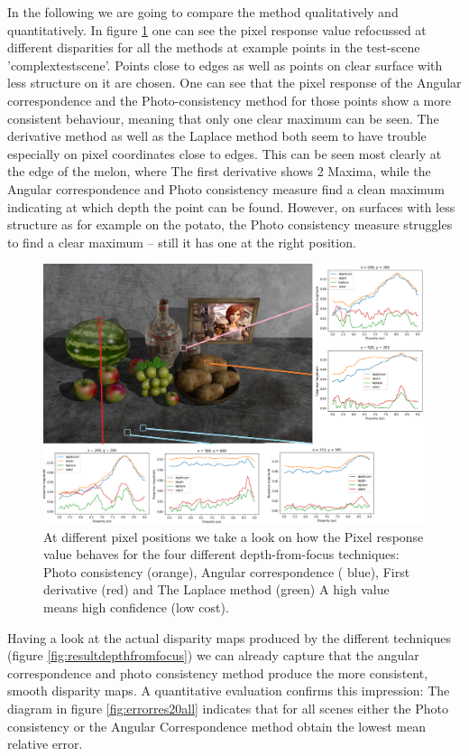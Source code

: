 \documentclass  [
  paper    = a4,
  BCOR     = 10mm,
  twoside,
  fontsize = 12pt,
  fleqn,
  toc      = bibnumbered,
  toc      = listofnumbered,
  numbers  = noendperiod,
  headings = normal,
  listof   = leveldown,
  version  = 3.03
]                                       {scrreprt}
\begin{document}
	In the following we are going to compare the method qualitatively and quantitatively. In figure \ref{fig:originalmarked} one can see the pixel response value refocussed at different disparities for all the methods at example points in the test-scene 'complextestscene'. Points close to edges as well as points on clear surface with less structure on it are chosen. One can see that the pixel response of the Angular correspondence and the Photo-consistency method for those points show a more consistent behaviour, meaning that only one clear maximum can be seen. The derivative method as well as the Laplace method both seem to have trouble especially on pixel coordinates close to edges. This can be seen most clearly at the edge of the melon, where The first derivative shows 2 Maxima, while the Angular correspondence and Photo consistency measure find a clean maximum indicating at which depth the point can be found. However, on surfaces with less structure as for example on the potato, the Photo consistency measure struggles to find a clear maximum -- still it has one at the right position. 
	\begin{figure}
		\centering
		\includegraphics[width=1\linewidth]{images/original_marked}
		\caption[Pixel response for depth from focus techniques]{At different pixel positions we take a look on how the Pixel response value behaves for the four different depth-from-focus techniques: Photo consistency (orange), Angular correspondence ( blue), First derivative (red) and The Laplace method (green) A high value means high confidence (low cost).}
		\label{fig:originalmarked}
	\end{figure}
	Having a look at the actual disparity maps produced by the different techniques (figure \ref{fig:resultdepthfromfocus}) we can already capture that the angular correspondence and photo consistency method produce the more consistent, smooth disparity maps. A quantitative evaluation confirms this impression:
	The diagram in figure \ref{fig:errorres20all} indicates that for all scenes either the Photo consistency or the Angular Correspondence method obtain the lowest mean relative error.
	
\end{document}
